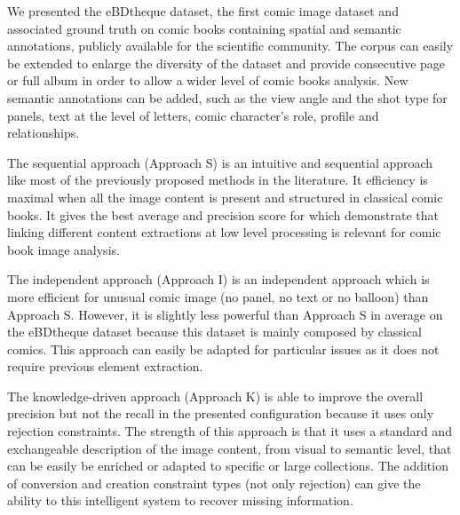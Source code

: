 We presented the eBDtheque dataset, the first comic image dataset and associated ground truth on comic books containing spatial and semantic annotations, publicly available for the scientific community.
The corpus can easily be extended to enlarge the diversity of the dataset and provide consecutive page or full album in order to allow a wider level of comic books analysis.
New semantic annotations can be added, such as the view angle and the shot type for panels, text at the level of letters, comic character's role, profile and relationships. 

The sequential approach (Approach S) is an intuitive and sequential approach like most of the previously proposed methods in the literature.
It efficiency is maximal when all the image content is present and structured in classical comic books.
It gives the best average and precision score for  which demonstrate that linking different content extractions at low level processing is relevant for comic book image analysis.

The independent approach (Approach I) is an independent approach which is more efficient for unusual comic image (no panel, no text or no balloon) than Approach S.
However, it is slightly less powerful than Approach S in average on the eBDtheque dataset because this dataset is mainly composed by classical comics.
This approach can easily be adapted for particular issues as it does not require previous element extraction.

The knowledge-driven approach (Approach K) is able to improve the overall precision but not the recall in the presented configuration because it uses only rejection constraints.
The strength of this approach is that it uses a standard and exchangeable description of the image content, from visual to semantic level, that can be easily be enriched or adapted to specific or large collections.
The addition of conversion and creation constraint types (not only rejection) can give the ability to this intelligent system to recover missing information.



